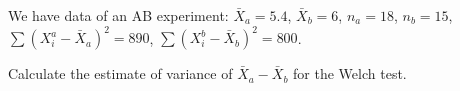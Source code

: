 
\begin{question}
We have data of an AB experiment: \(\bar X_a = 5.4\), \(\bar X_b = 6\),
\(n_a = 18\), \(n_b = 15\), \(\sum (X_i^a - \bar X_a)^2 = 890\),
\(\sum (X_i^b - \bar X_b)^2 = 800\).

Calculate the estimate of variance of \(\bar X_a - \bar X_b\) for the Welch test.

\end{question}


